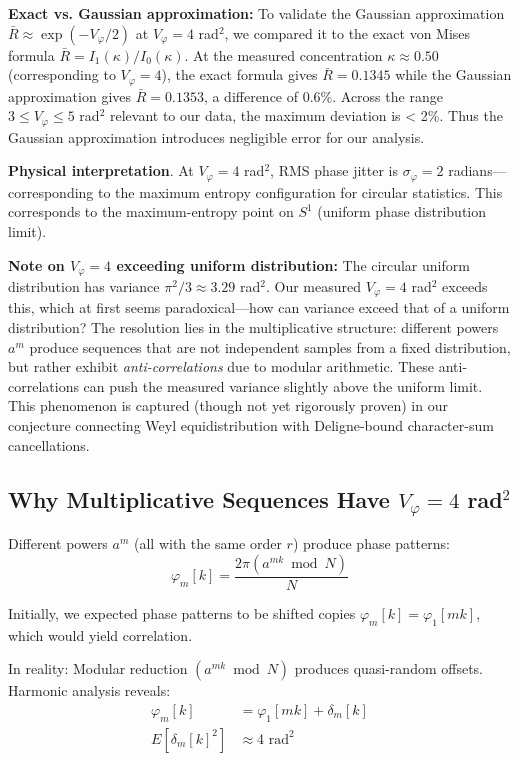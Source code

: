 \documentclass[10pt,twocolumn]{article}
\begin{document}
\textbf{Exact vs. Gaussian approximation:} To validate the Gaussian approximation $\bar{R} \approx \exp(-V_\varphi/2)$ at $V_\varphi = 4$ rad$^2$, we compared it to the exact von Mises formula $\bar{R} = I_1(\kappa)/I_0(\kappa)$. At the measured concentration $\kappa \approx 0.50$ (corresponding to $V_\varphi = 4$), the exact formula gives $\bar{R} = 0.1345$ while the Gaussian approximation gives $\bar{R} = 0.1353$, a difference of 0.6\%. Across the range $3 \leq V_\varphi \leq 5$ rad$^2$ relevant to our data, the maximum deviation is < 2\%. Thus the Gaussian approximation introduces negligible error for our analysis.

\textbf{Physical interpretation}. At $V_\varphi = 4$ rad$^2$, RMS phase jitter is $\sigma_\varphi = 2$ radians---corresponding to the maximum entropy configuration for circular statistics. This corresponds to the maximum-entropy point on $S^1$ (uniform phase distribution limit).

\textbf{Note on $V_\varphi = 4$ exceeding uniform distribution:} The circular uniform distribution has variance $\pi^2/3 \approx 3.29$ rad$^2$. Our measured $V_\varphi = 4$ rad$^2$ exceeds this, which at first seems paradoxical---how can variance exceed that of a uniform distribution? The resolution lies in the multiplicative structure: different powers $a^m$ produce sequences that are not independent samples from a fixed distribution, but rather exhibit \emph{anti-correlations} due to modular arithmetic. These anti-correlations can push the measured variance slightly above the uniform limit. This phenomenon is captured (though not yet rigorously proven) in our conjecture connecting Weyl equidistribution with Deligne-bound character-sum cancellations.

\subsection{Why Multiplicative Sequences Have $V_\varphi = 4$ rad$^2$}

Different powers $a^m$ (all with the same order $r$) produce phase patterns:
\begin{equation}
\varphi_m[k] = \frac{2\pi (a^{mk} \bmod N)}{N}
\end{equation}

Initially, we expected phase patterns to be shifted copies $\varphi_m[k] = \varphi_1[mk]$, which would yield correlation.

In reality: Modular reduction $(a^{mk} \bmod N)$ produces quasi-random offsets. Harmonic analysis reveals:
\begin{align}
\varphi_m[k] &= \varphi_1[mk] + \delta_m[k] \\
E[\delta_m[k]^2] &\approx 4 \text{ rad}^2
\end{align}
\end{document}
